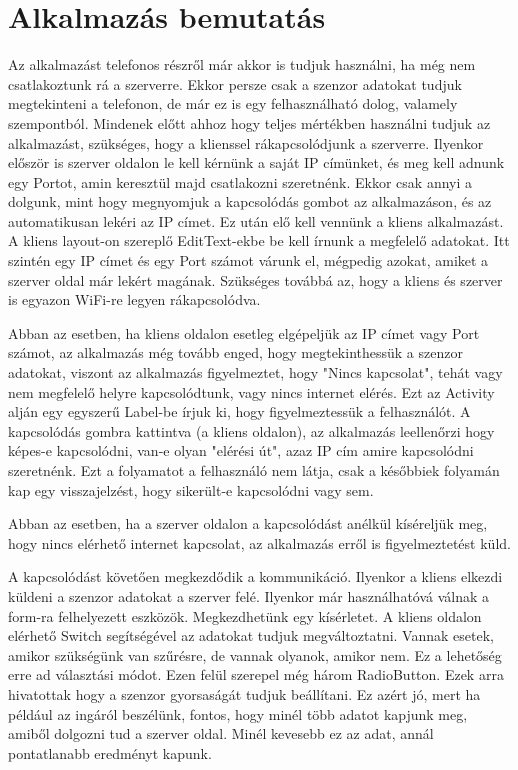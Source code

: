 \documentclass{thesis-ekf}
\theoremstyle{definition}
\theoremstyle{remark}
\begin{document}
\chapter{Alkalmazás bemutatás}
Az alkalmazást telefonos részről már akkor is tudjuk használni, ha még nem csatlakoztunk rá a szerverre. Ekkor persze csak a szenzor adatokat tudjuk megtekinteni a telefonon, de már ez is egy felhasználható dolog, valamely szempontból. Mindenek előtt ahhoz hogy teljes mértékben használni tudjuk az alkalmazást, szükséges, hogy a klienssel rákapcsolódjunk a szerverre. Ilyenkor először is szerver oldalon le kell kérnünk a saját IP címünket, és meg kell adnunk egy Portot, amin keresztül majd csatlakozni szeretnénk. Ekkor csak annyi a dolgunk, mint hogy megnyomjuk a kapcsolódás gombot az alkalmazáson, és az automatikusan lekéri az IP címet. Ez után elő kell vennünk a kliens alkalmazást. A kliens layout-on szereplő EditText-ekbe be kell írnunk a megfelelő adatokat. Itt szintén egy IP címet és egy Port számot várunk el, mégpedig azokat, amiket a szerver oldal már lekért magának. Szükséges továbbá az, hogy a kliens és szerver is egyazon WiFi-re legyen rákapcsolódva.
\par Abban az esetben, ha kliens oldalon esetleg elgépeljük az IP címet vagy Port számot, az alkalmazás még tovább enged, hogy megtekinthessük a szenzor adatokat, viszont az alkalmazás figyelmeztet, hogy "Nincs kapcsolat", tehát vagy nem megfelelő helyre kapcsolódtunk, vagy nincs internet elérés. Ezt az Activity alján egy egyszerű Label-be írjuk ki, hogy figyelmeztessük a felhasználót. A kapcsolódás gombra kattintva (a kliens oldalon), az alkalmazás leellenőrzi hogy képes-e kapcsolódni, van-e olyan "elérési út", azaz IP cím amire kapcsolódni szeretnénk. Ezt a folyamatot a felhasználó nem látja, csak a későbbiek folyamán kap egy visszajelzést, hogy sikerült-e kapcsolódni vagy sem.
\par Abban az esetben, ha a szerver oldalon a kapcsolódást anélkül kíséreljük meg, hogy nincs elérhető internet kapcsolat, az alkalmazás erről is figyelmeztetést küld.
\par A kapcsolódást követően megkezdődik a kommunikáció. Ilyenkor a kliens elkezdi küldeni a szenzor adatokat a szerver felé. Ilyenkor már használhatóvá válnak a form-ra felhelyezett eszközök. Megkezdhetünk egy kísérletet. A kliens oldalon elérhető Switch segítségével az adatokat tudjuk megváltoztatni. Vannak esetek, amikor szükségünk van szűrésre, de vannak olyanok, amikor nem. Ez a lehetőség erre ad választási módot. Ezen felül szerepel még három RadioButton. Ezek arra hivatottak hogy a szenzor gyorsaságát tudjuk beállítani. Ez azért jó, mert ha például az ingáról beszélünk, fontos, hogy minél több adatot kapjunk meg, amiből dolgozni tud a szerver oldal. Minél kevesebb ez az adat, annál pontatlanabb eredményt kapunk.
\end{document}
